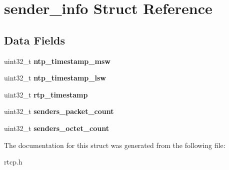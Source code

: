 \section{sender\+\_\+info Struct Reference}
\label{structsender__info}
\subsection*{Data Fields}
\begin{DoxyCompactItemize}
\item 
\mbox{\label{structsender__info_a5c2ce5fad17fefb474208105364080da}} 
uint32\+\_\+t {\bfseries ntp\+\_\+timestamp\+\_\+msw}
\item 
\mbox{\label{structsender__info_a8e180d3dac559655e7801f3d0f592232}} 
uint32\+\_\+t {\bfseries ntp\+\_\+timestamp\+\_\+lsw}
\item 
\mbox{\label{structsender__info_a2fb06e7f174250a1059283a114162b4a}} 
uint32\+\_\+t {\bfseries rtp\+\_\+timestamp}
\item 
\mbox{\label{structsender__info_a2982bc7c57b3ce7e17d3fbd7738d7932}} 
uint32\+\_\+t {\bfseries senders\+\_\+packet\+\_\+count}
\item 
\mbox{\label{structsender__info_a6f59d3bed23ea1208276d8d9867309c5}} 
uint32\+\_\+t {\bfseries senders\+\_\+octet\+\_\+count}
\end{DoxyCompactItemize}


The documentation for this struct was generated from the following file\+:\begin{DoxyCompactItemize}
\item 
rtcp.\+h\end{DoxyCompactItemize}
